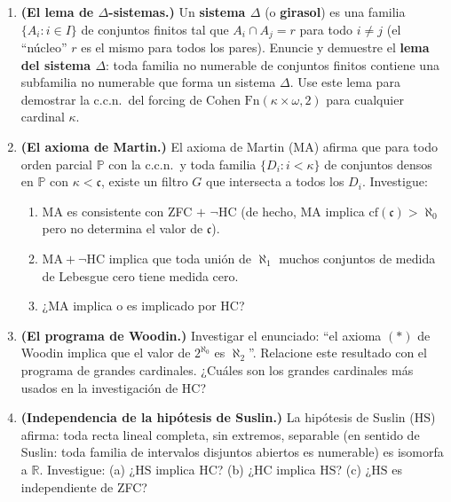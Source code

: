 \begin{enumerate}[leftmargin=2em, label=\textbf{P\arabic*$'$.}]

  \item \textbf{(El lema de $\Delta$-sistemas.)} Un \textbf{sistema $\Delta$} (o \textbf{girasol}) es una familia $\{A_i : i \in I\}$ de conjuntos finitos tal que $A_i \cap A_j = r$ para todo $i \neq j$ (el ``núcleo'' $r$ es el mismo para todos los pares). Enuncie y demuestre el \textbf{lema del sistema $\Delta$}: toda familia no numerable de conjuntos finitos contiene una subfamilia no numerable que forma un sistema $\Delta$. Use este lema para demostrar la c.c.n.\ del forcing de Cohen $\mathrm{Fn}(\kappa \times \omega, 2)$ para cualquier cardinal $\kappa$.

  \item \textbf{(El axioma de Martin.)} El axioma de Martin ($\mathrm{MA}$) afirma que para todo orden parcial $\mathbb{P}$ con la c.c.n.\ y toda familia $\{D_i : i < \kappa\}$ de conjuntos densos en $\mathbb{P}$ con $\kappa < \mathfrak{c}$, existe un filtro $G$ que intersecta a todos los $D_i$. Investigue:
  \begin{enumerate}[label=(\alph*)]
    \item $\mathrm{MA}$ es consistente con ZFC $+$ $\neg$HC (de hecho, $\mathrm{MA}$ implica $\mathrm{cf}(\mathfrak{c}) > \aleph_0$ pero no determina el valor de $\mathfrak{c}$).
    \item $\mathrm{MA} + \neg\mathrm{HC}$ implica que toda unión de $\aleph_1$ muchos conjuntos de medida de Lebesgue cero tiene medida cero.
    \item ¿$\mathrm{MA}$ implica o es implicado por HC?
  \end{enumerate}

  \item \textbf{(El programa de Woodin.)} Investigar el enunciado: ``el axioma $(\ast)$ de Woodin implica que el valor de $2^{\aleph_0}$ es $\aleph_2$''. Relacione este resultado con el programa de grandes cardinales. ¿Cuáles son los grandes cardinales más usados en la investigación de HC?

  \item \textbf{(Independencia de la hipótesis de Suslin.)} La hipótesis de Suslin ($\mathrm{HS}$) afirma: toda recta lineal completa, sin extremos, separable (en sentido de Suslin: toda familia de intervalos disjuntos abiertos es numerable) es isomorfa a $\mathbb{R}$. Investigue: (a) ¿$\mathrm{HS}$ implica HC? (b) ¿HC implica $\mathrm{HS}$? (c) ¿$\mathrm{HS}$ es independiente de ZFC?

\end{enumerate}

